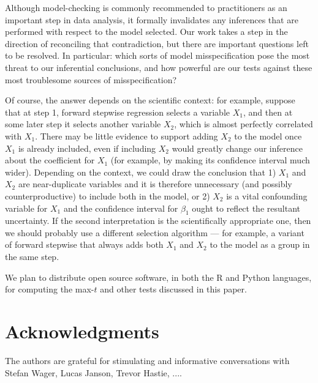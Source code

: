 \documentclass{article}
\begin{document}
Although model-checking is commonly recommended to practitioners as an important step in data analysis, it formally invalidates any inferences that are performed with respect to the model selected. Our work takes a step in the direction of reconciling that contradiction, but there are important questions left to be resolved. In particular: which sorts of model misspecification pose the most threat to our inferential conclusions, and how powerful are our tests against these most troublesome sources of misspecification? 

Of course, the answer depends on the scientific context: for example, suppose that at step 1, forward stepwise regression selects a variable $X_1$, and then at some later step it selects another variable $X_2$, which is almost perfectly correlated with $X_1$. There may be little evidence to support adding $X_2$ to the model once $X_1$ is already included, even if including $X_2$ would greatly change our inference about the coefficient for $X_1$ (for example, by making its confidence interval much wider). Depending on the context, we could draw the conclusion that 1) $X_1$ and $X_2$ are near-duplicate variables and it is therefore unnecessary (and possibly counterproductive) to include both in the model, or 2) $X_2$ is a vital confounding variable for $X_1$ and the confidence interval for $\beta_1$ ought to reflect the resultant uncertainty. If the second interpretation is the scientifically appropriate one, then we should probably use a different selection algorithm --- for example, a variant of forward stepwise that always adds both $X_1$ and $X_2$ to the model as a group in the same step.

We plan to distribute  open source software, in both the R and Python languages,  for computing the max-$t$ and other tests discussed in this paper.


\section*{Acknowledgments}

The authors are grateful for stimulating and informative conversations with Stefan Wager, Lucas Janson, Trevor Hastie, ....



\end{document}
